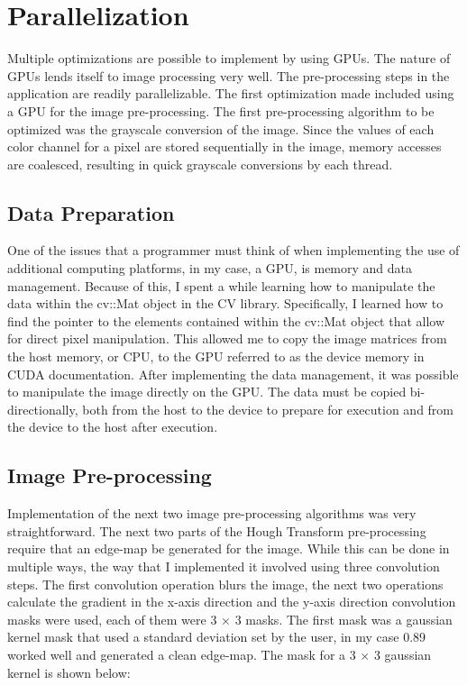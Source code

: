 \documentclass[conference]{IEEEtran}
\begin{document}
\section{Parallelization}
Multiple optimizations are possible to implement by using GPUs. 
The nature of GPUs lends itself to image processing very well. 
The pre-processing steps in the application are readily parallelizable. 
The first optimization made included using a GPU for the image pre-processing. 
The first pre-processing algorithm to be optimized was the grayscale conversion of the image. 
Since the values of each color channel for a pixel are stored sequentially in the image, memory accesses are coalesced, resulting in quick grayscale conversions by each thread. 


\subsection{Data Preparation}
One of the issues that a programmer must think of when implementing the use of additional computing platforms, in my case, a GPU, is memory and data management. 
Because of this, I spent a while learning how to manipulate the data within the cv::Mat object in the CV library. 
Specifically, I learned how to find the pointer to the elements contained within the cv::Mat object that allow for direct pixel manipulation. This allowed me to copy the image matrices from the host memory, or CPU, to the GPU referred to as the device memory in CUDA documentation. 
After implementing the data management, it was possible to manipulate the image directly on the GPU. 
The data must be copied bi-directionally, both from the host to the device to prepare for execution and from the device to the host after execution.  


\subsection{Image Pre-processing}
Implementation of the next two image pre-processing algorithms was very straightforward. 
The next two parts of the Hough Transform pre-processing require that an edge-map be generated for the image. 
While this can be done in multiple ways, the way that I implemented it involved using three convolution steps. 
The first convolution operation blurs the image, the next two operations calculate the gradient in the x-axis direction and the y-axis direction convolution masks were used, each of them were 3 $\times$ 3 masks. 
The first mask was a gaussian kernel mask that used a standard deviation set by the user, in my case 0.89 worked well and generated a clean edge-map. The mask for a 3 $\times$ 3 gaussian kernel is shown below:
\end{document}
